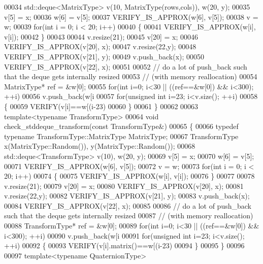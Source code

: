 \begin{DoxyCode}
00034   std::deque<MatrixType> v(10, MatrixType(rows,cols)), w(20, y);
00035   v[5] = x;
00036   w[6] = v[5];
00037   VERIFY\_IS\_APPROX(w[6], v[5]);
00038   v = w;
00039   \textcolor{keywordflow}{for}(\textcolor{keywordtype}{int} i = 0; i < 20; i++)
00040   \{
00041     VERIFY\_IS\_APPROX(w[i], v[i]);
00042   \}
00043 
00044   v.resize(21);
00045   v[20] = x;
00046   VERIFY\_IS\_APPROX(v[20], x);
00047   v.resize(22,y);
00048   VERIFY\_IS\_APPROX(v[21], y);
00049   v.push\_back(x);
00050   VERIFY\_IS\_APPROX(v[22], x);
00051 
00052   \textcolor{comment}{// do a lot of push\_back such that the deque gets internally resized}
00053   \textcolor{comment}{// (with memory reallocation)}
00054   MatrixType* ref = &w[0];
00055   \textcolor{keywordflow}{for}(\textcolor{keywordtype}{int} i=0; i<30 || ((ref==&w[0]) && i<300); ++i)
00056     v.push\_back(w[i%
00057   \textcolor{keywordflow}{for}(\textcolor{keywordtype}{unsigned} \textcolor{keywordtype}{int} i=23; i<v.size(); ++i)
00058   \{
00059     VERIFY(v[i]==w[(i-23)%
00060   \}
00061 \}
00062 
00063 \textcolor{keyword}{template}<\textcolor{keyword}{typename} TransformType>
00064 \textcolor{keywordtype}{void} check\_stddeque\_transform(\textcolor{keyword}{const} TransformType&)
00065 \{
00066   \textcolor{keyword}{typedef} \textcolor{keyword}{typename} TransformType::MatrixType MatrixType;
00067   TransformType x(MatrixType::Random()), y(MatrixType::Random());
00068   std::deque<TransformType> v(10), w(20, y);
00069   v[5] = x;
00070   w[6] = v[5];
00071   VERIFY\_IS\_APPROX(w[6], v[5]);
00072   v = w;
00073   \textcolor{keywordflow}{for}(\textcolor{keywordtype}{int} i = 0; i < 20; i++)
00074   \{
00075     VERIFY\_IS\_APPROX(w[i], v[i]);
00076   \}
00077 
00078   v.resize(21);
00079   v[20] = x;
00080   VERIFY\_IS\_APPROX(v[20], x);
00081   v.resize(22,y);
00082   VERIFY\_IS\_APPROX(v[21], y);
00083   v.push\_back(x);
00084   VERIFY\_IS\_APPROX(v[22], x);
00085 
00086   \textcolor{comment}{// do a lot of push\_back such that the deque gets internally resized}
00087   \textcolor{comment}{// (with memory reallocation)}
00088   TransformType* ref = &w[0];
00089   \textcolor{keywordflow}{for}(\textcolor{keywordtype}{int} i=0; i<30 || ((ref==&w[0]) && i<300); ++i)
00090     v.push\_back(w[i%
00091   \textcolor{keywordflow}{for}(\textcolor{keywordtype}{unsigned} \textcolor{keywordtype}{int} i=23; i<v.size(); ++i)
00092   \{
00093     VERIFY(v[i].matrix()==w[(i-23)%
00094   \}
00095 \}
00096 
00097 \textcolor{keyword}{template}<\textcolor{keyword}{typename} QuaternionType>

\end{DoxyCode}
